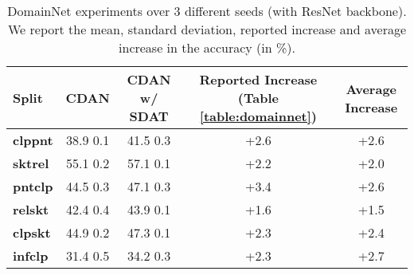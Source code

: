 \documentclass[table,dvipsnames]{article}
\theoremstyle{plain}
\theoremstyle{definition}
\theoremstyle{remark}
\begin{document}
\begin{table*}
    \centering
    \caption{ {DomainNet experiments over 3 different seeds (with ResNet backbone). We report the mean, standard deviation,  reported increase and average increase in the accuracy (in \%).}}
    \vskip 0.15in
     \begin{adjustbox}{max width=\columnwidth}
    \begin{tabular}{l|cc|cc}
    \hline
    {Split} &  CDAN & CDAN w/ SDAT & Reported Increase (Table \ref{table:domainnet}) & Average Increase\\
\hline \hline
    \textbf{clppnt} & 38.9   0.1 & 41.5  0.3 & +2.6 & +2.6 \\
    \textbf{sktrel} & 55.1   0.2 & 57.1   0.1 & +2.2 & +2.0 \\
    \textbf{pntclp } & 44.5   0.3 & 47.1   0.3 & +3.4 & +2.6\\
    \textbf{relskt } & 42.4   0.4 & 43.9   0.1& +1.6 & +1.5\\
    \textbf{clpskt } & 44.9   0.2 & 47.3   0.1 & +2.3 & +2.4\\
    \textbf{infclp} & 31.4   0.5 & 34.2   0.3 & +2.3 & +2.7\\
    \end{tabular}
    
    \label{tab:seed_exp}
    \end{adjustbox}
\end{table*}
\end{document}
